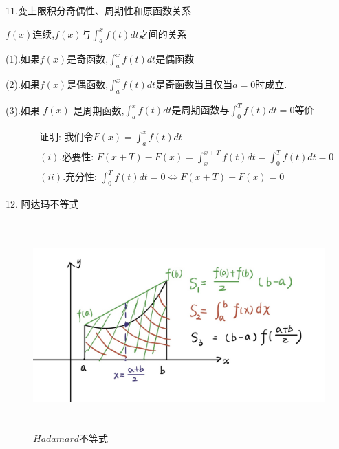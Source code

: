 11.变上限积分奇偶性、周期性和原函数关系
\begin{lemma}\label{lem: 变上限积分奇偶性和周期性与原函数关系}
	$f(x)$连续,$f(x)$与$\int_{a}^{x} f(t)dt$之间的关系
	
	(1).如果$f(x)$是奇函数,$\int_{a}^{x}f(t)dt$是偶函数
	
	(2).如果$f(x)$是偶函数,$\int_{a}^{x}f(t)dt$是奇函数当且仅当$a=0$时成立.
	
	(3).如果 $f(x)$ 是周期函数,$\int_{a}^{x}f(t)dt\text{是周期函数与}\int_{0}^{T}f(t)dt=0\text{等价}$
	
	\begin{eqnarray*}
		&&\text{证明:  我们令} F(x)=\int_{a}^{x}f(t)dt\\
		&&(i).\text{必要性:  } F(x+T)-F(x)=\int_{x}^{x+T}f(t)dt=\int_{0}^{T}f(t)dt=0\\
		&&(ii).\text{充分性:  }
		\int_{0}^{T}f(t)dt=0\Leftrightarrow F(x+T)-F(x)=0
	\end{eqnarray*}
\end{lemma}
12. 阿达玛不等式
\begin{figure}[htbp]
	\centering
	\includegraphics[width=15cm,height=8cm]{"figure/Summary/阿达玛不等式.jpg"}
	\caption{$Hadamard$不等式}
	\label{Figure: $Hadamard$不等式}
\end{figure} 
